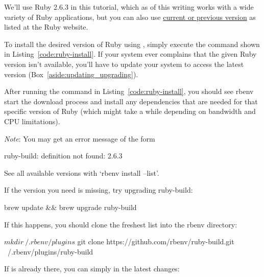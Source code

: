 We'll use Ruby 2.6.3 in this tutorial, which as of this writing works with a wide variety of Ruby applications, but you can also use \href{https://www.ruby-lang.org/en/downloads/}{current or previous version} as listed at the Ruby website.

To install the desired version of Ruby using , simply execute the command shown in Listing~\ref{code:ruby-install}. If your system ever complains that the given Ruby version isn't available, you'll have to update your system to access the latest version (Box~\ref{aside:updating_upgrading}).


\noindent After running the command in Listing~\ref{code:ruby-install}, you should see rbenv start the download process and install any dependencies that are needed for that specific version of Ruby (which might take a while depending on bandwidth and CPU limitations).

\emph{Note}: You may get an error message of the form

\begin{code}
ruby-build: definition not found: 2.6.3

See all available versions with `rbenv install --list'.

If the version you need is missing, try upgrading ruby-build:

  brew update && brew upgrade ruby-build
\end{code}

\noindent If this happens, you should clone the freshest  list into the rbenv  directory:

\begin{code}
$ mkdir ~/.rbenv/plugins
$ git clone https://github.com/rbenv/ruby-build.git ~/.rbenv/plugins/ruby-build
\end{code}

\noindent If  is already there, you can simply  in the latest changes:


